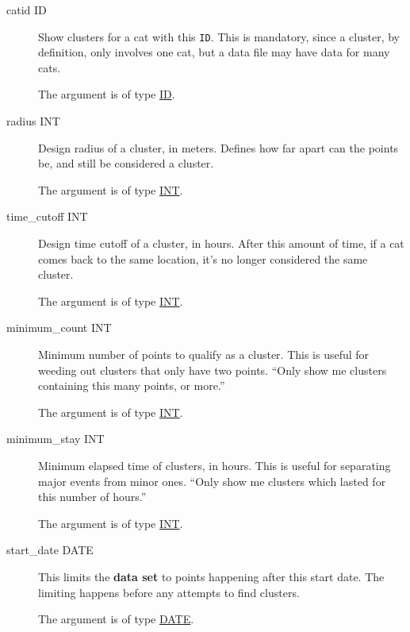 \begin{description}
\item[catid ID]
\hypertarget{cluster-catid}{}

Show clusters for a cat with this \verb=ID=. This is mandatory, since
a cluster, by definition, only involves one cat, but a data file may
have data for many cats.

The argument is of type \hyperlink{argument-type-id}{ID}.

\item[radius INT]
\hypertarget{cluster-radius}{}

Design radius of a cluster, in meters. Defines how far apart can the
points be, and still be considered a cluster.

The argument is of type \hyperlink{argument-type-int}{INT}.

\item[time\_cutoff INT]
\hypertarget{cluster-time-cutoff}{}

Design time cutoff of a cluster, in hours. After this amount of time,
if a cat comes back to the same location, it's no longer considered
the same cluster.

The argument is of type \hyperlink{argument-type-int}{INT}.

\item[minimum\_count INT]
\hypertarget{cluster-minimum-count}{}

Minimum number of points to qualify as a cluster. This is useful for
weeding out clusters that only have two points. ``Only show me
clusters containing this many points, or more.''

The argument is of type \hyperlink{argument-type-int}{INT}.

\item[minimum\_stay INT]
\hypertarget{cluster-minimum-stay}{}

Minimum elapsed time of clusters, in hours. This is useful for
separating major events from minor ones. ``Only show me clusters
which lasted for this number of hours.''

The argument is of type \hyperlink{argument-type-int}{INT}.

\item[start\_date DATE]
\hypertarget{cluster-start-date}{}

This limits the \textbf{data set} to points happening after this start
date. The limiting happens before any attempts to find clusters.

The argument is of type \hyperlink{argument-type-date}{DATE}.


\end{description}
